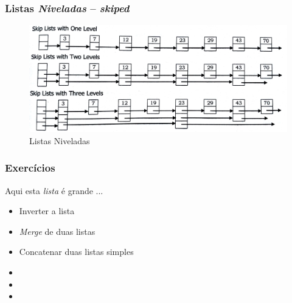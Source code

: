 
\begin{frame}%

\frametitle{Listas \textit{Niveladas} -- \textit{skiped}}

\begin{figure}[!hb]
	\centering
	\includegraphics[height=0.50\paperheight, width=0.7\paperwidth]{figs/fig_listas/skipped_listas.jpg}						
			\caption{Listas Niveladas}	
		\end{figure} 

\end{frame} 


\begin{frame}%

\frametitle{Exercícios}

\begin{block}{Aqui esta \textit{lista} é grande ... }

\begin{itemize}
  \item Inverter a lista
  \item \textit{Merge} de duas listas
  \item Concatenar duas listas simples
  \item 
  \item 
  \item 
  
  
  
\end{itemize}


\end{block}


\end{frame} 






